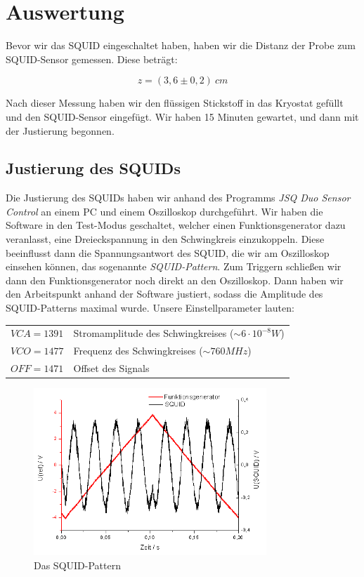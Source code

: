 \section{Auswertung}

Bevor wir das SQUID eingeschaltet haben, haben wir die Distanz der Probe zum SQUID-Sensor gemessen. Diese beträgt:

$$z = (3,6 \pm 0,2)\ cm$$

Nach dieser Messung haben wir den flüssigen Stickstoff in das Kryostat gefüllt und den SQUID-Sensor eingefügt. Wir haben 15 Minuten gewartet, und dann mit der Justierung begonnen.

\subsection{Justierung des SQUIDs}

Die Justierung des SQUIDs haben wir anhand des Programms \emph{JSQ Duo Sensor Control} an einem PC und einem Oszilloskop durchgeführt. Wir haben die Software in den Test-Modus geschaltet, welcher einen Funktionsgenerator dazu veranlasst, eine Dreieckspannung in den Schwingkreis einzukoppeln. Diese beeinflusst dann die Spannungsantwort des SQUID, die wir am Oszilloskop einsehen können, das sogenannte \emph{SQUID-Pattern}. Zum Triggern schließen wir dann den Funktionsgenerator noch direkt an den Oszilloskop.  Dann haben wir den Arbeitspunkt anhand der Software justiert, sodass die Amplitude des SQUID-Patterns maximal wurde. Unsere Einstellparameter lauten:\\

\begin{center}
\begin{tabular}[H]{l l}
	$VCA = 1391$ & Stromamplitude des Schwingkreises ($\sim 6\cdot 10^{-8} W$)\\
	$VCO = 1477$ & Frequenz des Schwingkreises ($\sim 760 MHz$)\\
	$OFF = 1471$  & Offset des Signals
\end{tabular}
\end{center}

\begin{figure}[H]
	\centering \includegraphics[width = 0.78\textwidth]{Bilder/Pattern1.png}
	\caption{Das SQUID-Pattern}
\end{figure}

